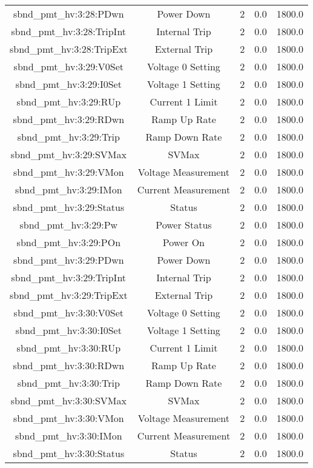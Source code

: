 \begin{center}
\begin{longtable}{c | c c c c }
sbnd\_pmt\_hv:3:28:PDwn & Power Down & 2 & 0.0 & 1800.0\\ 
sbnd\_pmt\_hv:3:28:TripInt & Internal Trip & 2 & 0.0 & 1800.0\\ 
sbnd\_pmt\_hv:3:28:TripExt & External Trip & 2 & 0.0 & 1800.0\\ 
sbnd\_pmt\_hv:3:29:V0Set & Voltage 0 Setting & 2 & 0.0 & 1800.0\\ 
sbnd\_pmt\_hv:3:29:I0Set & Voltage 1 Setting & 2 & 0.0 & 1800.0\\ 
sbnd\_pmt\_hv:3:29:RUp & Current 1 Limit & 2 & 0.0 & 1800.0\\ 
sbnd\_pmt\_hv:3:29:RDwn & Ramp Up Rate & 2 & 0.0 & 1800.0\\ 
sbnd\_pmt\_hv:3:29:Trip & Ramp Down Rate & 2 & 0.0 & 1800.0\\ 
sbnd\_pmt\_hv:3:29:SVMax & SVMax & 2 & 0.0 & 1800.0\\ 
sbnd\_pmt\_hv:3:29:VMon & Voltage Measurement & 2 & 0.0 & 1800.0\\ 
sbnd\_pmt\_hv:3:29:IMon & Current Measurement & 2 & 0.0 & 1800.0\\ 
sbnd\_pmt\_hv:3:29:Status & Status & 2 & 0.0 & 1800.0\\ 
sbnd\_pmt\_hv:3:29:Pw & Power Status & 2 & 0.0 & 1800.0\\ 
sbnd\_pmt\_hv:3:29:POn & Power On & 2 & 0.0 & 1800.0\\ 
sbnd\_pmt\_hv:3:29:PDwn & Power Down & 2 & 0.0 & 1800.0\\ 
sbnd\_pmt\_hv:3:29:TripInt & Internal Trip & 2 & 0.0 & 1800.0\\ 
sbnd\_pmt\_hv:3:29:TripExt & External Trip & 2 & 0.0 & 1800.0\\ 
sbnd\_pmt\_hv:3:30:V0Set & Voltage 0 Setting & 2 & 0.0 & 1800.0\\ 
sbnd\_pmt\_hv:3:30:I0Set & Voltage 1 Setting & 2 & 0.0 & 1800.0\\ 
sbnd\_pmt\_hv:3:30:RUp & Current 1 Limit & 2 & 0.0 & 1800.0\\ 
sbnd\_pmt\_hv:3:30:RDwn & Ramp Up Rate & 2 & 0.0 & 1800.0\\ 
sbnd\_pmt\_hv:3:30:Trip & Ramp Down Rate & 2 & 0.0 & 1800.0\\ 
sbnd\_pmt\_hv:3:30:SVMax & SVMax & 2 & 0.0 & 1800.0\\ 
sbnd\_pmt\_hv:3:30:VMon & Voltage Measurement & 2 & 0.0 & 1800.0\\ 
sbnd\_pmt\_hv:3:30:IMon & Current Measurement & 2 & 0.0 & 1800.0\\ 
sbnd\_pmt\_hv:3:30:Status & Status & 2 & 0.0 & 1800.0\\ 

\end{longtable}
\end{center}

